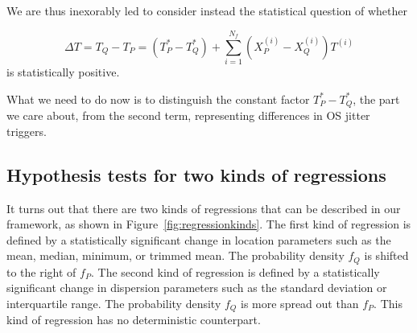 \documentclass[conference]{IEEEtran}
\begin{document}
We are thus inexorably led to consider instead the statistical question of whether

\begin{equation}
\Delta T = T_Q - T_P
= (T^*_P - T^*_Q) + \sum_{i=1}^{N_f} (X^{(i)}_P - X^{(i)}_Q) T^{(i)}
\end{equation}
%
is statistically positive.

What we need to do now is to distinguish the constant factor $T^*_P - T^*_Q$, the part we care about, from the second term, representing differences in OS jitter triggers.


\subsection{Hypothesis tests for two kinds of regressions}

It turns out that there are two kinds of regressions that can be described in our framework, as shown in Figure~\ref{fig:regressionkinds}. The first kind of regression is defined by a statistically significant change in location parameters such as the mean, median, minimum, or trimmed mean. The probability density $f_Q$ is shifted to the right of $f_P$. The second kind of regression is defined by a statistically significant change in dispersion parameters such as the standard deviation or interquartile range. The probability density $f_Q$ is more spread out than $f_P$. This kind of regression has no deterministic counterpart.
\end{document}
